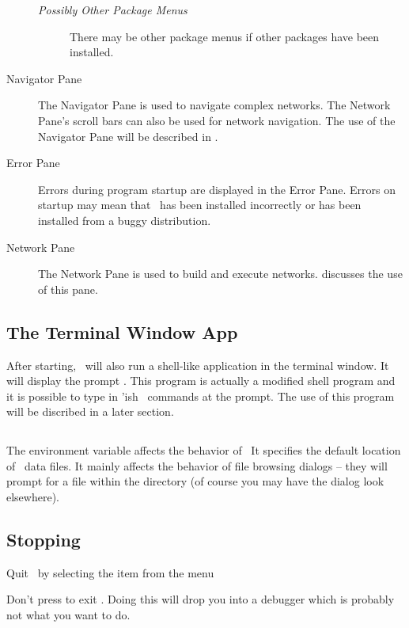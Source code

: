 \begin{description}
  \begin{description}
  \item [\textit{Possibly Other Package Menus}] There may be other package
    menus if other packages have been installed.
  \end{description}

\item[Navigator Pane] The Navigator Pane is used to navigate complex
  networks.  The Network Pane's scroll bars can also be used for network
  navigation.  The use of the Navigator Pane will be described in
  .
  
\item[Error Pane] Errors during program startup are displayed in the Error
  Pane.  Errors on startup may mean that \sr\ has been installed
  incorrectly or has been installed from a buggy distribution.
  
\item[Network Pane] The Network Pane is used to build and execute networks.
   discusses the use of this
  pane.

\end{description}

\subsection{The Terminal Window App}
\label{sec:termwinapp}

After starting, \sr\ will also run a shell-like application in the terminal
window.  It will display the prompt .  This program is
actually a modified  shell program and it
is possible to type in 'ish \sr\ commands at the prompt. The
use of this program will be discribed in a later section.


\subsection{}
\label{sec:scirundata}

The environment variable  affects the behavior of \sr\ 
It specifies the default location of \sr\ data files.  It mainly affects
the behavior of file browsing dialogs -- they will prompt for a file within
the \envvar{SCIRUN\_DATA} directory (of course you may have the dialog look
elsewhere).


\subsection{Stopping}
\label{sec:stopping}

Quit \sr\ by selecting the  item from the  menu

Don't press  to exit \sr.  Doing this will drop you into
a debugger which is probably not what you want to do.







